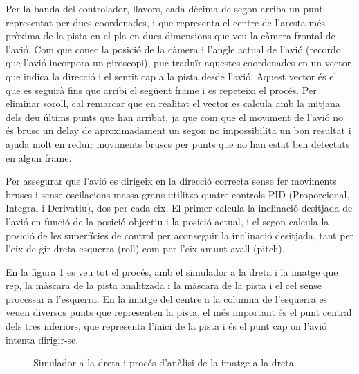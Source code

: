 \documentclass[10pt,a4paper,twocolumn,twoside]{article}
\begin{document}
Per la banda del controlador, llavors, cada dècima de segon arriba un punt representat per dues coordenades, i que representa
el centre de l'aresta més pròxima de la pista en el pla en dues dimensions que veu la càmera frontal de l'avió. Com que 
conec la posició de la càmera i l'angle actual de l'avió (recordo que l'avió incorpora un giroscopi), puc traduïr aquestes
coordenades en un vector que indica la direcció i el sentit cap a la pista desde l'avió. Aquest vector és el que es seguirà
fins que arribi el següent frame i es repeteixi el procés. Per eliminar soroll, cal remarcar que en realitat el vector es
calcula amb la mitjana dels deu últims punts que han arribat, ja que com que el moviment de l'avió no és brusc un delay de 
aproximadament un segon no impossibilita un bon resultat i ajuda molt en reduïr moviments bruscs per punts que no han
estat ben detectats en algun frame.

Per assegurar que l'avió es dirigeix en la direcció correcta sense fer moviments bruscs i sense oscilacions massa grans utilitzo
quatre controls PID (Proporcional, Integral i Derivatiu), dos per cada eix. El primer calcula la inclinació desitjada de l'avió 
en funció de la posició objectiu i la posició actual, i el segon calcula la posició de les superfícies de control per aconseguir 
la inclinació desitjada, tant per l'eix de gir dreta-esquerra (roll) com per l'eix amunt-avall (pitch).

En la figura \ref{fig-aterratge-simulador} es veu tot el procés, amb el simulador a la dreta i la imatge que rep, la màscara de la
pista analitzada i la màscara de la pista i el cel sense processar a l'esquerra. En la imatge del centre a la columna de l'esquerra
es veuen diversos punts que representen la pista, el més important és el punt central dels tres inferiors, que representa l'inici de 
la pista i és el punt cap on l'avió intenta dirigir-se.

\begin{figure}[h]
\centering
{}
    \caption{Simulador a la dreta i procés d'anàlisi de la imatge a la dreta.}
    \label{fig-aterratge-simulador}
\end{figure}
\end{document}
